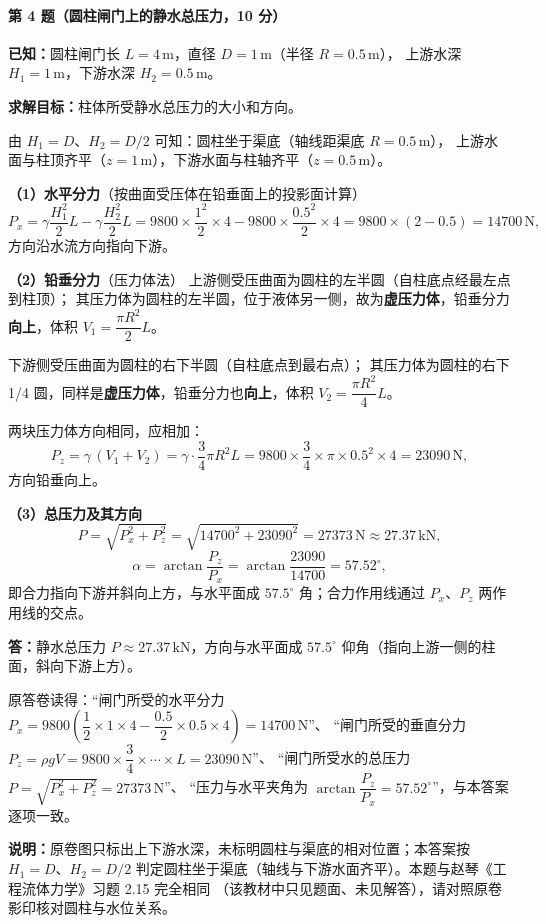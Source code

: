 \paragraph{第 4 题（圆柱闸门上的静水总压力，10 分）}
\begin{jie}
\textbf{已知：}圆柱闸门长 $L=4\,\mathrm{m}$，直径 $D=1\,\mathrm{m}$（半径 $R=0.5\,\mathrm{m}$），
上游水深 $H_1=1\,\mathrm{m}$，下游水深 $H_2=0.5\,\mathrm{m}$。

\textbf{求解目标：}柱体所受静水总压力的大小和方向。

由 $H_1=D$、$H_2=D/2$ 可知：圆柱坐于渠底（轴线距渠底 $R=0.5\,\mathrm{m}$），
上游水面与柱顶齐平（$z=1\,\mathrm{m}$），下游水面与柱轴齐平（$z=0.5\,\mathrm{m}$）。

\textbf{（1）水平分力}（按曲面受压体在铅垂面上的投影面计算）
\[
P_x=\gamma\frac{H_1^{2}}{2}L-\gamma\frac{H_2^{2}}{2}L
=9800\times\frac{1^{2}}{2}\times4-9800\times\frac{0.5^{2}}{2}\times4
=9800\times(2-0.5)=14700\,\mathrm{N},
\]
方向沿水流方向指向下游。

\textbf{（2）铅垂分力}（压力体法）
上游侧受压曲面为圆柱的左半圆（自柱底点经最左点到柱顶）；
其压力体为圆柱的左半圆，位于液体另一侧，故为\textbf{虚压力体}，铅垂分力\textbf{向上}，体积
$V_1=\dfrac{\pi R^{2}}{2}L$。

下游侧受压曲面为圆柱的右下半圆（自柱底点到最右点）；
其压力体为圆柱的右下 1/4 圆，同样是\textbf{虚压力体}，铅垂分力也\textbf{向上}，体积
$V_2=\dfrac{\pi R^{2}}{4}L$。

两块压力体方向相同，应相加：
\[
P_z=\gamma\,(V_1+V_2)=\gamma\cdot\frac{3}{4}\pi R^{2}L
=9800\times\frac{3}{4}\times\pi\times0.5^{2}\times4=23090\,\mathrm{N},
\]
方向铅垂向上。

\textbf{（3）总压力及其方向}
\[
P=\sqrt{P_x^{2}+P_z^{2}}=\sqrt{14700^{2}+23090^{2}}=27373\,\mathrm{N}\approx27.37\,\mathrm{kN},
\]
\[
\alpha=\arctan\frac{P_z}{P_x}=\arctan\frac{23090}{14700}=57.52^{\circ},
\]
即合力指向下游并斜向上方，与水平面成 $57.5^{\circ}$ 角；合力作用线通过 $P_x$、$P_z$ 两作用线的交点。

\textbf{答：}静水总压力 $P\approx27.37\,\mathrm{kN}$，方向与水平面成 $57.5^{\circ}$ 仰角（指向上游一侧的柱面，斜向下游上方）。
\end{jie}

\begin{tishi}
原答卷读得：``闸门所受的水平分力 $P_x=9800\left(\dfrac{1}{2}\times1\times4-\dfrac{0.5}{2}\times0.5\times4\right)=14700\,\mathrm{N}$''、
``闸门所受的垂直分力 $P_z=\rho gV=9800\times\dfrac{3}{4}\times\cdots\times L=23090\,\mathrm{N}$''、
``闸门所受水的总压力 $P=\sqrt{P_x^{2}+P_z^{2}}=27373\,\mathrm{N}$''、
``压力与水平夹角为 $\arctan\dfrac{P_z}{P_x}=57.52^{\circ}$''，与本答案逐项一致。

\textbf{说明：}原卷图只标出上下游水深，未标明圆柱与渠底的相对位置；本答案按 $H_1=D$、$H_2=D/2$
判定圆柱坐于渠底（轴线与下游水面齐平）。本题与赵琴《工程流体力学》习题 2.15 完全相同
（该教材中只见题面、未见解答），请对照原卷影印核对圆柱与水位关系。
\end{tishi}

